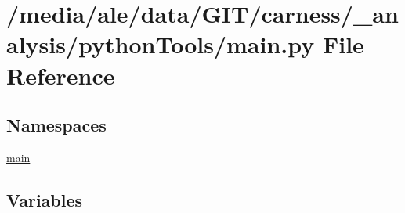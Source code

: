 \hypertarget{a00062}{\section{/media/ale/data/\-G\-I\-T/carness/\-\_\-analysis/python\-Tools/main.py File Reference}
\label{a00062}
}
\subsection*{Namespaces}
\begin{DoxyCompactItemize}
\item 
\hyperlink{a00122}{main}
\end{DoxyCompactItemize}
\subsection*{Variables}
